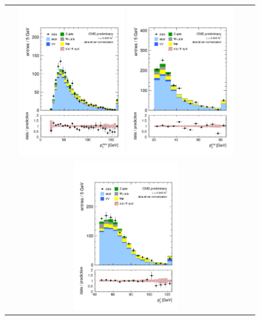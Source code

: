 \begin{figure}[h!]
\begin{center}
\begin{tabular}{cc}
  \includegraphics[width=0.45\textwidth]{figures/pt1} 
     \includegraphics[width=0.45\textwidth]{figures/pt2}\\
     \includegraphics[width=0.45\textwidth]{figures/ptll} 

\end{tabular}
\end{center}
\end{figure}

